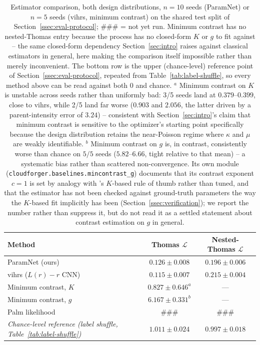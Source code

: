 \documentclass[11pt,letterpaper]{article}
\newcommand{\1}{\mathds{1}}
\theoremstyle{plain}
\theoremstyle{definitioncolon}
\begin{document}
\begin{table}[tbp]
\centering
\small
\begin{tabular}{lcc}
\toprule
Method & Thomas $\mathcal{L}$ & Nested-Thomas $\mathcal{L}$ \\
\midrule
ParamNet (ours)         & $0.126 \pm 0.008$ & $0.196 \pm 0.006$ \\
vihrs ($L(r)-r$ CNN)     & $0.115 \pm 0.007$ & $0.215 \pm 0.004$ \\
Minimum contrast, $K$   & $0.827 \pm 0.646^{a}$ & --- \\
Minimum contrast, $g$   & $6.167 \pm 0.331^{b}$ & --- \\
Palm likelihood         & \#\#\# & \#\#\# \\
\midrule
\emph{Chance-level reference (label shuffle, Table~\ref{tab:label-shuffle})} & \emph{$1.011 \pm 0.024$} & \emph{$0.997 \pm 0.018$} \\
\bottomrule
\end{tabular}
\caption{Estimator comparison, both design distributions, $n=10$ seeds
(ParamNet) or $n=5$ seeds (vihrs, minimum contrast) on the shared test split
of Section~\ref{ssec:eval-protocol}; \#\#\# = not yet run. Minimum contrast
has no nested-Thomas entry because the process has no closed-form $K$ or $g$
to fit against -- the same closed-form dependency Section~\ref{sec:intro}
raises against classical estimators in general, here making the comparison
itself impossible rather than merely inconvenient. The bottom row is the
upper (chance-level) reference point of Section~\ref{ssec:eval-protocol},
repeated from Table~\ref{tab:label-shuffle}, so every method above can be read
against both $0$ and chance. $^a$ Minimum contrast on $K$ is unstable across
seeds rather than uniformly bad: 3/5 seeds land at $0.379$--$0.399$, close to
vihrs, while 2/5 land far worse ($0.903$ and $2.056$, the latter driven by a
parent-intensity error of $3.24$) -- consistent with
Section~\ref{sec:intro}'s claim that minimum contrast is sensitive to the
optimizer's starting point specifically because the design distribution
retains the near-Poisson regime where $\kappa$ and $\mu$ are weakly
identifiable. $^b$ Minimum contrast on $g$ is, in contrast, consistently
worse than chance on $5/5$ seeds ($5.82$--$6.66$, tight relative to that
mean) -- a systematic bias rather than scattered non-convergence. Its own
module (\texttt{cloudforger.baselines.mincontrast\_g}) documents that its
contrast exponent $c=1$ is set by analogy with \citet{diggle2003spatial}'s
$K$-based rule of thumb rather than tuned, and that the estimator has not been
checked against ground-truth parameters the way the $K$-based fit implicitly
has been (Section~\ref{ssec:verification}); we report the number rather than
suppress it, but do not read it as a settled statement about contrast
estimation on $g$ in general.}
\label{tab:classical-comparison}
\end{table}
\end{document}
